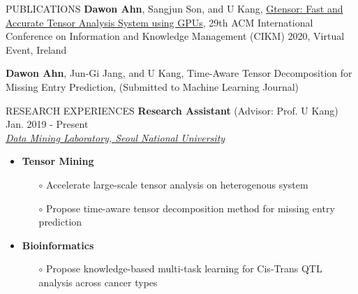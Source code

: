 \documentclass[10pt]{resume} %
\begin{document}
\begin{rSection}{PUBLICATIONS}
\textbf{Dawon Ahn}, Sangjun Son, and U Kang, 
	\href{https://dl.acm.org/doi/abs/10.1145/3340531.3417413}{
	Gtensor: Fast and Accurate Tensor Analysis System using GPUs}, 
	29th ACM International Conference on 
	Information and Knowledge Management (CIKM) 2020, Virtual Event, Ireland
	
%	
\textbf{Dawon Ahn}, Jun-Gi Jang, and U Kang, 
	Time-Aware Tensor Decomposition for Missing Entry Prediction, 
	(Submitted to Machine Learning Journal)
\end{rSection}


\begin{rSection}{RESEARCH EXPERIENCES}
{\bf Research Assistant} {(Advisor: Prof. U Kang)} \hfill Jan. 2019 - Present \\
\href{https://datalab.snu.ac.kr/}{\textit{Data Mining Laboratory, Seoul National University}}
%
\begin{itemize}
	\item {\bf Tensor Mining} \vspace{-1mm}
    \begin{itemize} \itemsep -4pt 
        \item[$\circ$] Accelerate large-scale tensor analysis on heterogenous system
%        
    	\item[$\circ$] Propose time-aware tensor decomposition method for missing entry prediction
%
    \end{itemize}
%    
    \item {\bf Bioinformatics} \vspace{-1mm}
    \begin{itemize} \itemsep -4pt 
        \item[$\circ$] Propose knowledge-based multi-task learning for Cis-Trans QTL analysis across cancer types
    \end{itemize}
\end{itemize}
\end{rSection}
\end{document}
